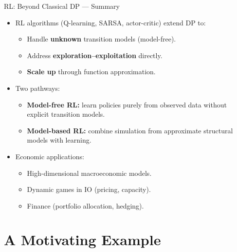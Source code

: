 \documentclass[10pt,english,aspectratio=169]{beamer}
\begin{document}
\begin{frame}{RL: Beyond Classical DP --- Summary}
    \begin{itemize}
        \item RL algorithms (Q-learning, SARSA, actor-critic) extend DP to:
        \begin{itemize}
            \item Handle \textbf{unknown} transition models (model-free).
            \item Address \textbf{exploration--exploitation} directly.
            \item \textbf{Scale up} through function approximation.
        \end{itemize}
        \item Two pathways:
        \begin{itemize}
            \item \textbf{Model-free RL:} learn policies purely from observed data without explicit transition models.
            \item \textbf{Model-based RL:} combine simulation from approximate structural models with learning.
        \end{itemize}
        \item Economic applications:
        \begin{itemize}
            \item High-dimensional macroeconomic models.
            \item Dynamic games in IO (pricing, capacity).
            \item Finance (portfolio allocation, hedging).
        \end{itemize}
    \end{itemize}
\end{frame}


\section{A Motivating Example}
\end{document}
